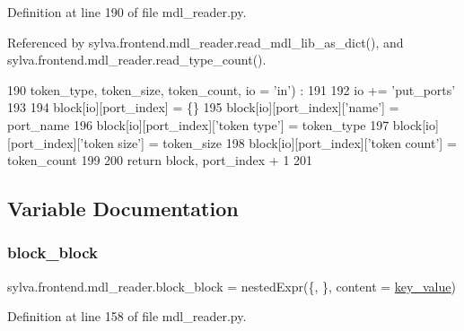 Definition at line 190 of file mdl\+\_\+reader.\+py.



Referenced by sylva.\+frontend.\+mdl\+\_\+reader.\+read\+\_\+mdl\+\_\+lib\+\_\+as\+\_\+dict(), and sylva.\+frontend.\+mdl\+\_\+reader.\+read\+\_\+type\+\_\+count().


\begin{DoxyCode}
190     token\_type, token\_size, token\_count, io = \textcolor{stringliteral}{'in'}) :
191 
192     io += \textcolor{stringliteral}{'put\_ports'}
193 
194     block[io][port\_index] = \{\}
195     block[io][port\_index][\textcolor{stringliteral}{'name'}] = port\_name
196     block[io][port\_index][\textcolor{stringliteral}{'token type'}] = token\_type
197     block[io][port\_index][\textcolor{stringliteral}{'token size'}] = token\_size
198     block[io][port\_index][\textcolor{stringliteral}{'token count'}] = token\_count
199 
200     \textcolor{keywordflow}{return} block, port\_index + 1
201 
\end{DoxyCode}


\subsection{Variable Documentation}
\mbox{\label{namespacesylva_1_1frontend_1_1mdl__reader_ab48e53340e0d8180cc9ac1c1636be161}} 
\subsubsection{\texorpdfstring{block\+\_\+block}{block\_block}}
{\footnotesize\ttfamily sylva.\+frontend.\+mdl\+\_\+reader.\+block\+\_\+block = nested\+Expr(\textquotesingle{}\{\textquotesingle{}, \textquotesingle{}\}\textquotesingle{}, content = \hyperlink{namespacesylva_1_1frontend_1_1mdl__reader_ab486fd03c0920f56c3256072a68fa07e}{key\+\_\+value})}



Definition at line 158 of file mdl\+\_\+reader.\+py.

\mbox{\label{namespacesylva_1_1frontend_1_1mdl__reader_ac7180f117231855bb60b36d9602c72a1}} 
